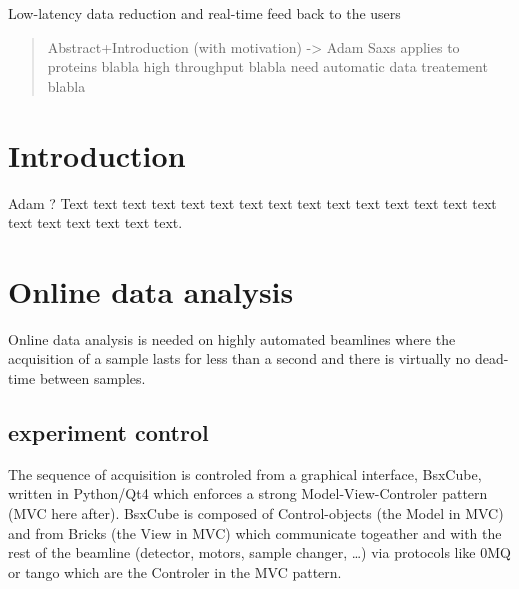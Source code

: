 \documentclass[preprint]{iucr}              %
\begin{document}
\maketitle                        %

\begin{synopsis}
Low-latency data reduction and real-time feed back to the users 
\end{synopsis}

\begin{abstract}
Abstract+Introduction (with motivation) -> Adam
Saxs applies to proteins blabla
high throughput blabla
need automatic data treatement blabla
\end{abstract}



\section{Introduction}

Adam ?
Text text text text text text text text text text text text text text
text text text text text text text.



\section{Online data analysis}

Online data analysis is needed on highly automated beamlines where the
acquisition of a sample lasts for less than a second and there is virtually no
dead-time between samples.


\subsection{experiment control}
The sequence of acquisition is controled from a graphical interface, BsxCube,
written in Python/Qt4 \cite{pyqt} which enforces a strong Model-View-Controler
pattern\cite{mvc} (MVC here after).
BsxCube is composed of Control-objects (the Model in MVC) and from Bricks (the
View in MVC) which communicate togeather and with the rest of the beamline
(detector, motors, sample changer, \ldots) via protocols like 0MQ\cite{zmq} or
tango\cite{tango} which are the Controler in the MVC pattern.
\end{document}
